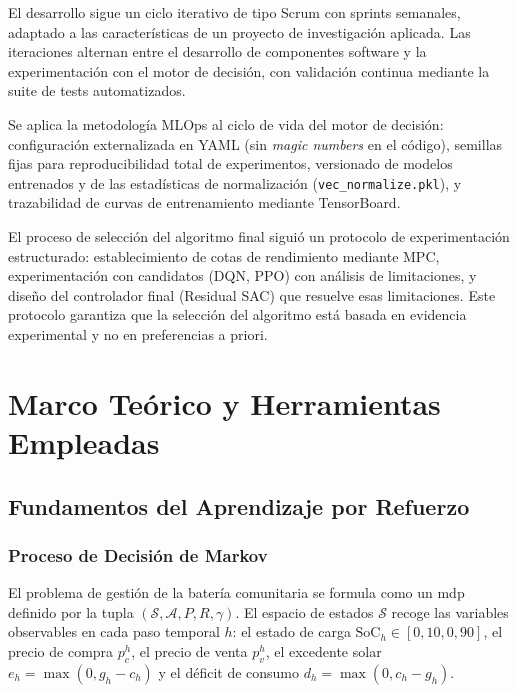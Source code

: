 \documentclass[12pt, a4paper, twoside]{report}
\begin{document}
El desarrollo sigue un ciclo iterativo de tipo Scrum con sprints semanales,
adaptado a las características de un proyecto de investigación aplicada. Las
iteraciones alternan entre el desarrollo de componentes software y la
experimentación con el motor de decisión, con validación continua mediante la
suite de tests automatizados.

Se aplica la metodología MLOps al ciclo de vida del motor de decisión:
configuración externalizada en YAML (sin \textit{magic numbers} en el código),
semillas fijas para reproducibilidad total de experimentos, versionado de modelos
entrenados y de las estadísticas de normalización (\texttt{vec\_normalize.pkl}),
y trazabilidad de curvas de entrenamiento mediante TensorBoard.

El proceso de selección del algoritmo final siguió un protocolo de
experimentación estructurado: establecimiento de cotas de rendimiento mediante
MPC, experimentación con candidatos (DQN, PPO) con análisis de limitaciones, y
diseño del controlador final (Residual SAC) que resuelve esas limitaciones. Este
protocolo garantiza que la selección del algoritmo está basada en evidencia
experimental y no en preferencias a priori.

\chapter{Marco Teórico y Herramientas Empleadas}
\label{chap:marco}

\section{Fundamentos del Aprendizaje por Refuerzo}
\label{sec:fundamentos_rl}

\subsection{Proceso de Decisión de Markov}

El problema de gestión de la batería comunitaria se formula como un
\acrfull{mdp} definido por la tupla $(\mathcal{S}, \mathcal{A}, P, R, \gamma)$.
El espacio de estados $\mathcal{S}$ recoge las variables observables en cada
paso temporal $h$: el estado de carga $\text{SoC}_h \in [0{,}10, 0{,}90]$, el
precio de compra $p_c^h$, el precio de venta $p_v^h$, el excedente solar
$e_h = \max(0, g_h - c_h)$ y el déficit de consumo $d_h = \max(0, c_h - g_h)$.
\end{document}
